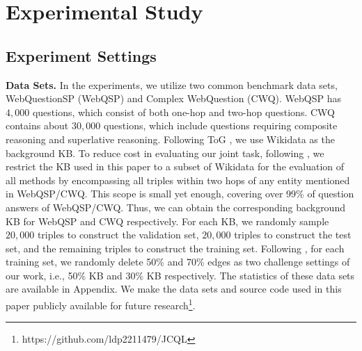\documentclass[11pt]{article}
\begin{document}





\section{Experimental Study} \label{sec:4}
\subsection{Experiment Settings} \label{sec:4.1}
\textbf{Data Sets.} In the experiments, we utilize two common benchmark data sets, WebQuestionSP (WebQSP) and Complex WebQuestion (CWQ). WebQSP has $4,000$ questions, which consist of both one-hop and two-hop questions. CWQ contains about $30,000$ questions, which include questions requiring composite reasoning and superlative reasoning. Following ToG \cite{sun2023thinkongraph}, we use Wikidata as the background KB. 
To reduce cost in evaluating our joint task, following \cite{lihui2022binet}, we restrict the KB used in this paper to a subset of Wikidata for the evaluation of all methods by encompassing all triples within two hops of any entity mentioned in WebQSP/CWQ. This scope is small yet enough, covering over 99\% of question answers of WebQSP/CWQ. 
Thus, we can obtain the corresponding background KB for WebQSP and CWQ respectively. For each KB, we randomly sample $20,000$ triples to construct the validation set, $20,000$ triples to construct the test set, and the remaining triples to construct the training set. Following \cite{lihui2022binet}, for each training set, we randomly delete 50\% and 70\% edges as two challenge settings of our work, i.e., 50\% KB and 30\% KB respectively. 
The statistics of these data sets are available in Appendix. We make the data sets and source code used in this paper publicly available for future research\footnote{{https://github.com/ldp2211479/JCQL}}. 

\end{document}
